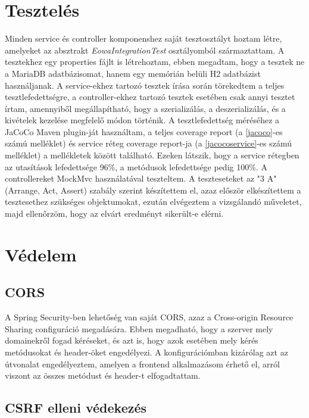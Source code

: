 \documentclass[a4paper,12pt]{report}
\theoremstyle{definition}
\theoremstyle{remark}
\begin{document}
\section{Tesztelés}

Minden service és controller komponenshez saját tesztosztályt hoztam létre, amelyeket az absztrakt \textit{EowaIntegrationTest} osztályomból származtattam.  A tesztekhez egy properties fájlt is létrehoztam, ebben megadtam, hogy a tesztek ne a MariaDB adatbázisomat, hanem egy memórián belüli H2 adatbázist használjanak. A service-ekhez tartozó tesztek írása során törekedtem a teljes tesztlefedettségre, a controller-ekhez tartozó tesztek esetében csak annyi tesztet írtam, amennyiből megállapítható, hogy a szerializálás, a deszerializálás, és a kivételek kezelése megfelelő módon történik. A tesztlefedettség méréséhez a JaCoCo\cite{Jacocowebsite} Maven plugin-ját használtam, a teljes coverage report (a \ref{jacoco}-es számú melléklet)  és service réteg coverage report-ja (a \ref{jacocoservice}-es számú melléklet) a mellékletek között található. Ezeken látszik, hogy a service rétegben az utasítások lefedettsége 96\%, a metódusok lefedettsége pedig 100\%. A controllereket MockMvc használatával teszteltem. A teszteseteket az "3 A"\cite{3Awebsite} (Arrange, Act, Assert) szabály szerint készítettem el, azaz először elkészítettem a tesztesethez szükséges objektumokat, ezután elvégeztem a vizsgálandó műveletet, majd ellenőrzöm, hogy az elvárt eredményt sikerült-e elérni.

\section{Védelem}

	\subsection{CORS}

A Spring Security-ben lehetőség van saját CORS, azaz a Cross-origin Resource Sharing\cite{Corswebsite} configuráció megadására. Ebben megadható, hogy a szerver mely domainekről fogad kéréseket, és azt is, hogy azok esetében mely kérés metódusokat és header-öket engedélyezi. A konfigurációmban kizárólag azt az útvonalat engedélyeztem, amelyen a frontend alkalmazásom érhető el, arról viszont az összes metódust és header-t elfogadtattam.


	\subsection{CSRF elleni védekezés}
\end{document}
